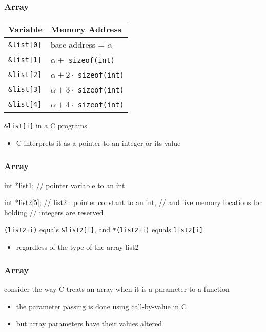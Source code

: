 \documentclass[newPxFont,sthlmFooter,nooffset]{beamer}
\begin{document}
\begin{frame}[t, fragile]
  \frametitle{Array}
  
  \begin{tabular}{l  l}
    Variable & Memory Address \\ \hline
\texttt{\&list[0]} & base address = $\alpha$ \\
\texttt{\&list[1]} & $\alpha +$ \texttt{sizeof(int)}\\
\texttt{\&list[2]} & $\alpha + 2 \cdot$ \texttt{sizeof(int)}\\
\texttt{\&list[3]} & $\alpha + 3 \cdot$ \texttt{sizeof(int)}\\
\texttt{\&list[4]} & $\alpha + 4 \cdot$ \texttt{sizeof(int)}\\
  \end{tabular}

\bigskip
\texttt{\&list[i]} in a C programs
\begin{itemize}
\item C interprets it as a pointer to an integer or its value
\end{itemize}

\end{frame}

\begin{frame}[t, fragile]
  \frametitle{Array}
\begin{codedef}
int *list1;          // pointer variable to an int
\end{codedef}

\begin{codedef}
int *list2[5];       // list2 : pointer constant to an int, 
                     // and five memory locations for holding 
                     // integers are reserved
\end{codedef}

\texttt{(list2+i)} equals \texttt{\&list2[i]}, and \texttt{*(list2+i)} equals \texttt{list2[i]}
\begin{itemize}
\item regardless of the type of the array list2
\end{itemize}
\end{frame}

\begin{frame}[t]
  \frametitle{Array}
consider the way C treats an array when it is a parameter to a function
\begin{itemize}
\item the parameter passing is done using call-by-value in C
\item but array parameters have their values altered
\end{itemize}

\end{frame}
\end{document}
